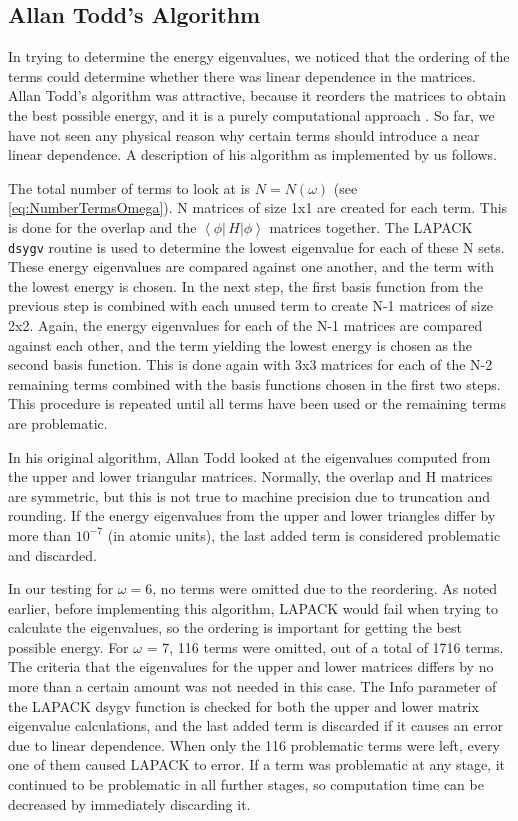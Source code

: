 \documentclass[Dissertation.tex]{subfiles}
\begin{document}
\subsection{Allan Todd's Algorithm}
\label{sec:ToddBound}
In trying to determine the energy eigenvalues, we noticed that the ordering 
of the terms could determine whether there was linear dependence in the 
matrices. Allan Todd's algorithm was attractive, because it reorders the 
matrices to obtain the best possible energy, and it is a purely computational 
approach \cite{Todd2007}. So far, we have not seen any physical reason why 
certain terms should introduce a near linear dependence. A description of his 
algorithm as implemented by us follows.

The total number of terms to look at is $N = N(\omega)$ (see \cref{eq:NumberTermsOmega}).
 N matrices of size 1x1 are created for each term. This 
is done for the overlap and the
 $\left\langle \phi \left| \,H \right| \phi \right\rangle$
 matrices together. The LAPACK \texttt{dsygv} routine is used to 
determine the lowest eigenvalue for each of these N sets. These energy 
eigenvalues are compared against one another, and the term with the lowest 
energy is chosen. In the next step, the first basis function from the 
previous step is combined with each unused term to create N-1 matrices of 
size 2x2. Again, the energy eigenvalues for each of the N-1 matrices are 
compared against each other, and the term yielding the lowest energy is 
chosen as the second basis function. This is done again with 3x3 matrices for 
each of the N-2 remaining terms combined with the basis functions chosen in 
the first two steps. This procedure is repeated until all terms have been 
used or the remaining terms are problematic.

In his original algorithm, Allan Todd looked at the eigenvalues computed from 
the upper and lower triangular matrices. Normally, the overlap and H matrices 
are symmetric, but this is not true to machine precision due to truncation 
and rounding. If the energy eigenvalues from the upper and lower triangles 
differ by more than $10^{-7}$ (in atomic units), the last added term is 
considered problematic and discarded.

In our testing for $\omega = 6$, no terms were omitted due to the reordering. 
As noted earlier, before implementing this algorithm, LAPACK would fail when 
trying to calculate the eigenvalues, so the ordering is important for getting 
the best possible energy. For $\omega$ = 7, 116 terms were omitted, out of a 
total of 1716 terms. The criteria that the eigenvalues for the upper and 
lower matrices differs by no more than a certain amount was not needed in 
this case. The Info parameter of the LAPACK dsygv function is checked for 
both the upper and lower matrix eigenvalue calculations, and the last added 
term is discarded if it causes an error due to linear dependence. When only 
the 116 problematic terms were left, every one of them caused LAPACK to 
error. If a term was problematic at any stage, it continued to be problematic 
in all further stages, so computation time can be decreased by immediately 
discarding it.
\end{document}
